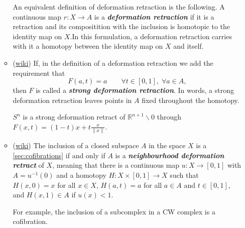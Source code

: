 \documentclass{article}
\newcommand{\R}{\mathbb{R}}
\begin{document}
\begin{defn}
\begin{itemize}
\begin{itemize}
			An equivalent definition of deformation retraction is the following. A continuous map $r:X\to A$ is a \textbf{\textit{deformation retraction}} if it is a retraction and its compositition with the inclusion is homotopic to the identity map on $X$.In this formulation, a deformation retraction carries with it a homotopy between the identity map on $X$ and itself.
			
			\item (\href{https://en.wikipedia.org/wiki/Retraction_(topology)#Deformation_retract_and_strong_deformation_retract}{wiki}) If, in the definition of a deformation retraction we add the requirement that
			\[F(a,t)=a\qquad\forall t\in[0,1],\;\forall a\in A,\]
			then $F$ is called a \textbf{\textit{strong deformation retraction}}. In words, a strong deformation retraction leaves points in $A$ fixed throughout the homotopy.
			
			\begin{example}
				$S^n$ is a strong deformation retract of $\R^{n+1}\backslash0$ through $F(x,t)=(1-t)x+t\frac{x}{\|x\|}$.
			\end{example}
			
			\item (\href{https://en.wikipedia.org/wiki/Retraction_(topology)#Cofibration_and_neighborhood_deformation_retract}{wiki}) The inclusion of a closed subspace $A$ in the space $X$ is a \cref{sec:cofibrations} if and only if $A$ is a \textbf{\textit{neighbourhood deformation retract}} of $X$, meaning that there is a continuous map $u:X\to[0,1]$ with $A=u^{-1}(0)$ and a homotopy $H:X\times[0,1]\to X$ such that $H(x,0)=x$ for all $x\in X$, $H(a,t)=a$ for all $a\in A$ and $t\in[0,1]$, and $H(x,1)\in A$ if $u(x)<1$.
			
			For example, the inclusion of a subcomplex in a CW complex is a cofibration.
		\end{itemize}
	\end{itemize}
\end{defn}
\end{document}
